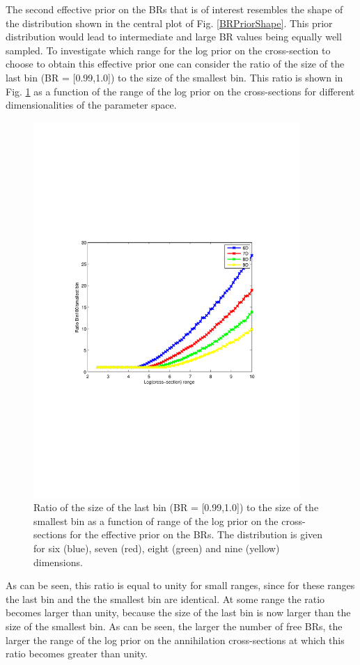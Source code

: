 \documentclass{article}
\begin{document}
The second effective prior on the BRs that is of interest resembles the shape of the distribution shown in the central plot of Fig. \ref{BRPriorShape}. This prior distribution would lead to intermediate and large BR values being equally well sampled. To investigate which range for the log prior on the cross-section to choose to obtain this effective prior one can consider the ratio of the size of the last bin (BR = [0.99,1.0]) to the size of the smallest bin. This ratio is shown in Fig. \ref{Bin100_Binsmallest} as a function of the range of the log prior on the cross-sections for different dimensionalities of the parameter space.
\begin{figure}
\centering
\includegraphics[trim = 70 240 90 240, clip = true, width=0.9\textwidth]{figs/Ratio_Bin100_Binsmallest}
\caption{Ratio of the size of the last bin (BR = [0.99,1.0]) to the size of the smallest bin as a function of range of the log prior on the cross-sections for the effective prior on the BRs. The distribution is given for six (blue), seven (red), eight (green) and nine (yellow) dimensions.}
\label{Bin100_Binsmallest}
\end{figure}
As can be seen, this ratio is equal to unity for small ranges, since for these ranges the last bin and the the smallest bin are identical. At some range the ratio becomes larger than unity, because the size of the last bin is now larger than the size of the smallest bin. As can be seen, the larger the number of free BRs, the larger the range of the log prior on the annihilation cross-sections at which this ratio becomes greater than unity.
\end{document}
